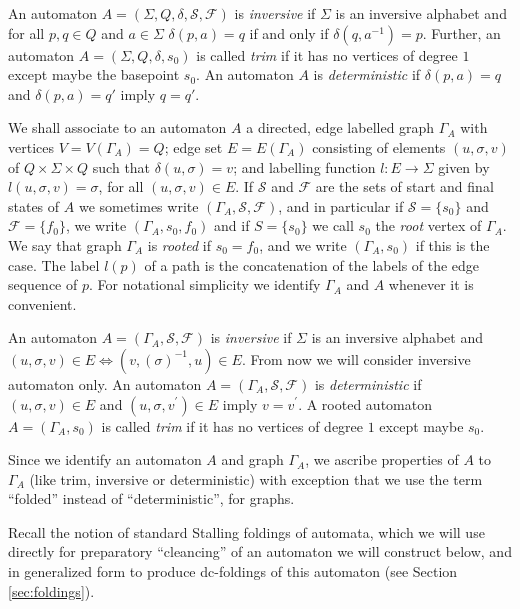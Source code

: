 \documentclass[a4paper,12pt]{article}
\newcommand{\G}{\Gamma }
\renewcommand{\d}{\delta }
\newcommand{\s}{\sigma }
\renewcommand{\S}{\Sigma }
\numberwithin{equation}{section}
\numberwithin{figure}{section}
\newcommand{\maps}{\rightarrow}
\begin{document}
An automaton $A = (\S, Q, \d, \mathcal{S},\mathcal{F})$ is {\em
inversive} if $\S$ is an inversive alphabet and for all $p, q \in
Q$ and $a \in \S$ $\d(p,a)=q$ if and only if $\d(q, a^{-1})=p$.
Further, an automaton $A= (\S, Q, \d, s_0)$ is called {\em trim}
if it has no vertices of degree $1$ except maybe the basepoint
$s_0$. An automaton $A$ is {\em deterministic} if $\d(p,a)=q$ and
$\d(p,a)=q'$ imply $q=q'$.

 We shall associate to an automaton $A$
a directed, edge labelled graph $\G_A$ with vertices
$V=V(\G_A)=Q$; edge set $E=E(\G_A)$ consisting of elements
$(u,\s,v)$ of $Q\times \S\times Q$ such that $\d(u,\s)=v$; and
labelling function $l:E\maps \S$ given by $l(u,\s,v)=\s$, for all
$(u,\s,v) \in E$.  If $\mathcal{S}$ and $\mathcal{F}$ are the sets
of start and final states of $A$ we sometimes write
$(\G_A,\mathcal{S},\mathcal{F})$, and in particular if
$\mathcal{S}=\{s_0\}$ and $\mathcal{F}=\{f_0\}$, we write
$(\G_A,s_0,f_0)$ and if $S=\{s_0\}$ we call $s_0$ the {\em root}
vertex of $\G_A$. We say that graph $\G_A$ is {\em rooted} if
$s_0=f_0$, and we write $(\G_A,s_0)$ if this is the case. The
label $l(p)$ of a path is the concatenation of the labels of the
edge sequence of $p$. For notational simplicity we identify $\G_A$
and $A$ whenever it is convenient.

An automaton $A = (\G_A, \mathcal{S}, \mathcal{F})$ is {\em
inversive} if $\S$ is an inversive alphabet and $(u, \s, v) \in E
\Leftrightarrow (v, (\s)^{-1}, u) \in E$. From now we will
consider inversive automaton only. An automaton $A  = (\G_A,
\mathcal{S}, \mathcal{F})$ is {\em deterministic} if $(u, \s, v)
\in E$ and $(u, \s, v^\prime) \in E$ imply $v=v^\prime$. A rooted
automaton $A= (\G_A, s_0)$ is called {\em trim} if it has no
vertices of degree $1$ except maybe $s_0$.

Since we identify an automaton $A$ and graph $\G_A$, we ascribe
properties of $A$ to $\G_A$ (like trim, inversive or
deterministic) with exception that we use the term ``folded''
instead of ``deterministic'', for graphs.

Recall the notion of standard Stalling foldings of automata, which
we will use directly for preparatory ``cleancing'' of an automaton
we will construct below, and in generalized form to produce
dc-foldings of this automaton (see Section \ref{sec:foldings}).
\end{document}
